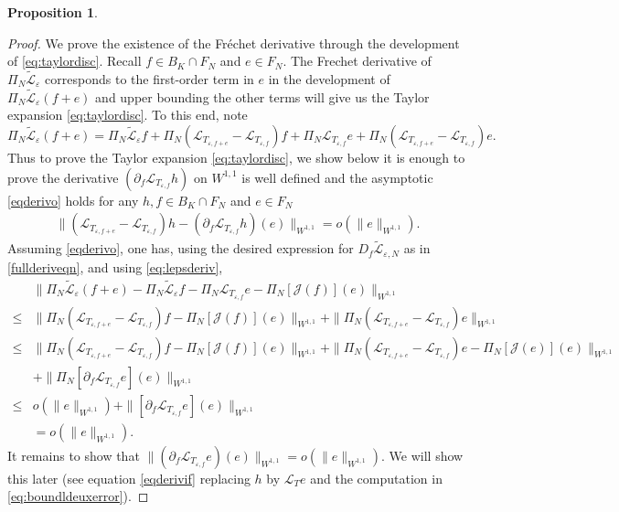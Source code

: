 \documentclass[12pt]{article}
\def\L{\mathcal{L}}
\newcommand{\eps}{\varepsilon}
\theoremstyle{plain}
\newtheorem{proposition}[theorem]{Proposition}
\begin{document}
{\begin{proposition}
\end{proposition}




\begin{proof}
We prove the existence of the Fr\'echet derivative through the development of \eqref{eq:taylordisc}. 
Recall $f\in B_K\cap F_N$ and $e\in F_N$.
The Frechet derivative of $\Pi_N\tilde{\L}_\eps$ corresponds to the first-order term in $e$ in the development of $\Pi_N\tilde{\L}_\eps(f+e)$ and upper bounding the other terms will give us the Taylor expansion \eqref{eq:taylordisc}.
To this end, note
\begin{equation}
\Pi_N\tilde{\L}_\eps(f+e)=\Pi_N\tilde{\L}_\eps f+\Pi_N(\L_{T_{\eps, f+e}}-\L_{T_{\eps, f}})f+\Pi_N\L_{T_{\eps, f}}e+\Pi_N(\L_{T_{\eps, f+e}}-\L_{T_{\eps, f}})e.
\label{eq:lepsderiv}
\end{equation}
Thus to prove the Taylor expansion \eqref{eq:taylordisc}, we show below it is enough to prove the derivative $(\partial_f\L_{T_{\eps, f}}h)$ on $W^{1,1}$ is well defined and the asymptotic \eqref{eqderivo} holds for any $h,f\in B_K\cap F_N$ and $e\in F_N$ 
\begin{align}\label{eqderivo}
    \|(\L_{T_{\eps, f+e}}-\L_{T_{\eps, f}})h-(\partial_f\L_{T_{\eps, f}}h)(e)\|_{W^{1,1}}=o(\|e\|_{W^{1,1}}).
\end{align}
Assuming \eqref{eqderivo}, one has, using the desired expression for $D_f\tilde{\L}_{\eps,N}$ as in \eqref{fullderiveqn}, and using \eqref{eq:lepsderiv},
\begin{align}
&\|\Pi_N\tilde{\L}_\eps(f+e)-\Pi_N\tilde{\L}_\eps f-\Pi_N\L_{T_{\eps, f}}e-\Pi_N\left[\mathcal J(f)\right](e)\|_{W^{1,1}}\nonumber\\
\leq& \|\Pi_N(\L_{T_{\eps, f+e}}-\L_{T_{\eps, f}})f-\Pi_N\left[\mathcal J(f)\right](e)\|_{W^{1,1}}+\|\Pi_N(\L_{T_{\eps, f+e}}-\L_{T_{\eps, f}})e\|_{W^{1,1}}\nonumber\\
\leq& \|\Pi_N(\L_{T_{\eps, f+e}}-\L_{T_{\eps, f}})f-\Pi_N\left[\mathcal J(f)\right](e)\|_{W^{1,1}}+\|\Pi_N(\L_{T_{\eps, f+e}}-\L_{T_{\eps, f}})e-\Pi_N\left[\mathcal J(e)\right](e)\|_{W^{1,1}}\nonumber\\
&+\|\Pi_N\left[\partial_f\L_{T_{\eps, f}}e\right](e)\|_{W^{1,1}}\nonumber\\
\leq & o(\|e\|_{W^{1,1}})+\|\left[\partial_f\L_{T_{\eps, f}}e\right](e)\|_{W^{1,1}}\label{eq:devtildelderiv}\\
&=o(\|e\|_{W^{1,1}}).\label{eq:devtildelderiv2}
\end{align}
It remains to show that $\|(\partial_f\L_{T_{\eps, f}}e)(e)\|_{W^{1,1}}=o(\|e\|_{W^{1,1}}).$
We will show this later 
(see equation \eqref{eqderivif} replacing $h$ by $\L_Te$ and the computation in \eqref{eq:boundldeuxerror}).


\end{proof}}
\end{document}

